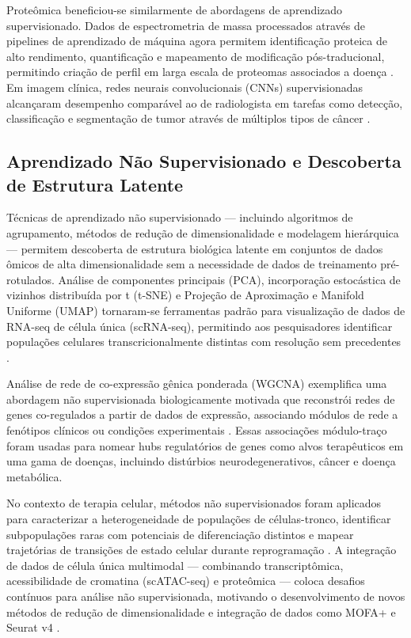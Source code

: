 Proteômica beneficiou-se similarmente de abordagens de aprendizado supervisionado. Dados de espectrometria de massa processados através de pipelines de aprendizado de máquina agora permitem identificação proteica de alto rendimento, quantificação e mapeamento de modificação pós-traducional, permitindo criação de perfil em larga escala de proteomas associados a doença \parencite{orre2019}. Em imagem clínica, redes neurais convolucionais (CNNs) supervisionadas alcançaram desempenho comparável ao de radiologista em tarefas como detecção, classificação e segmentação de tumor através de múltiplos tipos de câncer \parencite{litjens2017}.

\subsection{Aprendizado Não Supervisionado e Descoberta de Estrutura Latente}

Técnicas de aprendizado não supervisionado --- incluindo algoritmos de agrupamento, métodos de redução de dimensionalidade e modelagem hierárquica --- permitem descoberta de estrutura biológica latente em conjuntos de dados ômicos de alta dimensionalidade sem a necessidade de dados de treinamento pré-rotulados. Análise de componentes principais (PCA), incorporação estocástica de vizinhos distribuída por t (t-SNE) e Projeção de Aproximação e Manifold Uniforme (UMAP) tornaram-se ferramentas padrão para visualização de dados de RNA-seq de célula única (scRNA-seq), permitindo aos pesquisadores identificar populações celulares transcricionalmente distintas com resolução sem precedentes \parencite{mcinnes2018, becht2018}.

Análise de rede de co-expressão gênica ponderada (WGCNA) exemplifica uma abordagem não supervisionada biologicamente motivada que reconstrói redes de genes co-regulados a partir de dados de expressão, associando módulos de rede a fenótipos clínicos ou condições experimentais \parencite{langfelder2008}. Essas associações módulo-traço foram usadas para nomear hubs regulatórios de genes como alvos terapêuticos em uma gama de doenças, incluindo distúrbios neurodegenerativos, câncer e doença metabólica.

No contexto de terapia celular, métodos não supervisionados foram aplicados para caracterizar a heterogeneidade de populações de células-tronco, identificar subpopulações raras com potenciais de diferenciação distintos e mapear trajetórias de transições de estado celular durante reprogramação \parencite{saelens2019}. A integração de dados de célula única multimodal --- combinando transcriptômica, acessibilidade de cromatina (scATAC-seq) e proteômica --- coloca desafios contínuos para análise não supervisionada, motivando o desenvolvimento de novos métodos de redução de dimensionalidade e integração de dados como MOFA+ e Seurat v4 \parencite{argelaguet2020, hao2021}.

